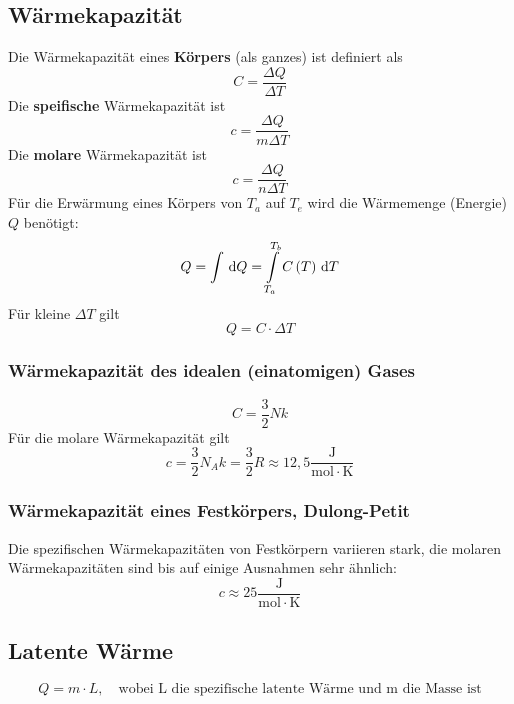 \subsection{Wärmekapazität}
Die Wärmekapazität eines \textbf{Körpers} (als ganzes) ist definiert als
\begin{equation}
C = \frac{\Delta Q}{\Delta T}
\end{equation}
Die \textbf{speifische} Wärmekapazität ist 
\begin{equation}
c = \frac{\Delta Q}{m \Delta T}
\end{equation}
Die \textbf{molare} Wärmekapazität ist 
\begin{equation}
c = \frac{\Delta Q}{n \Delta T}
\end{equation}
Für die Erwärmung eines Körpers von $T_a$ auf $T_e$ wird die Wärmemenge (Energie) $Q$ benötigt:
\begin{equation}
Q = \int \,\mathrm{d} Q = \int \limits_{T_a}^{T_b} C \left( T \right) \,\mathrm{d} T
\end{equation}
Für kleine $\Delta T$ gilt
\begin{equation}
Q = C \cdot \Delta T
\end{equation}
\subsubsection{Wärmekapazität des idealen (einatomigen) Gases}
\begin{equation}
C = \frac{3}{2}Nk
\end{equation}
Für die molare Wärmekapazität gilt
\begin{equation}
c = \frac{3}{2}N_Ak = \frac{3}{2} R \approx 12,5 \frac{\mathrm{J}}{\mathrm{mol \cdot K}}
\end{equation}
\subsubsection{Wärmekapazität eines Festkörpers, Dulong-Petit}
Die spezifischen Wärmekapazitäten von Festkörpern variieren stark, die molaren Wärmekapazitäten sind bis auf einige Ausnahmen sehr ähnlich:
\begin{equation}
c \approx 25 \frac{\mathrm{J}}{\mathrm{mol \cdot K}}
\end{equation}
\subsection{Latente Wärme}
\begin{equation}
Q = m \cdot L, \quad \text{wobei L die spezifische latente Wärme und m die Masse ist}
\end{equation}

